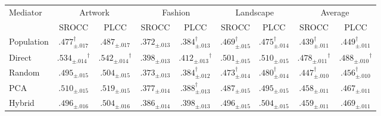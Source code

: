 \begin{tabular}{l cc cc cc cc}
\toprule
\multirow{2}{*}{Mediator} & \multicolumn{2}{c}{Artwork} & \multicolumn{2}{c}{Fashion} & \multicolumn{2}{c}{Landscape} & \multicolumn{2}{c}{Average} \\
\cmidrule(lr){2-3}\cmidrule(lr){4-5}\cmidrule(lr){6-7}\cmidrule(lr){8-9}
& SROCC & PLCC & SROCC & PLCC & SROCC & PLCC & SROCC & PLCC \\
\midrule
Population & $.477_{\pm .017}^{\dagger}$ & $.487_{\pm .017}$ & $.372_{\pm .013}$ & $.384_{\pm .013}^{\dagger}$ & $.469_{\pm .015}^{\dagger}$ & $.475_{\pm .014}^{\dagger}$ & $.439_{\pm .011}^{\dagger}$ & $.449_{\pm .011}^{\dagger}$ \\
Direct & $\bm{.534_{\pm .014}}^{\dagger}$ & $\bm{.542_{\pm .014}}^{\dagger}$ & $\bm{.398_{\pm .013}}$ & $\bm{.412_{\pm .013}}^{\dagger}$ & $\bm{.501_{\pm .015}}$ & $\bm{.510_{\pm .015}}$ & $\bm{.478_{\pm .011}}^{\dagger}$ & $\bm{.488_{\pm .010}}^{\dagger}$ \\
Random & $.495_{\pm .015}$ & $.504_{\pm .015}$ & $.373_{\pm .013}$ & $.384_{\pm .012}^{\dagger}$ & $.473_{\pm .014}^{\dagger}$ & $.480_{\pm .014}^{\dagger}$ & $.447_{\pm .010}^{\dagger}$ & $.456_{\pm .010}^{\dagger}$ \\
PCA & $.510_{\pm .015}$ & $.519_{\pm .015}$ & $.377_{\pm .014}$ & $.388_{\pm .013}^{\dagger}$ & $.487_{\pm .015}$ & $.495_{\pm .015}$ & $.458_{\pm .011}$ & $.467_{\pm .011}$ \\
Hybrid & $.496_{\pm .016}$ & $.504_{\pm .016}$ & $.386_{\pm .014}$ & $.398_{\pm .013}$ & $.496_{\pm .015}$ & $.504_{\pm .015}$ & $.459_{\pm .011}$ & $.469_{\pm .011}$ \\
\bottomrule
\end{tabular}

